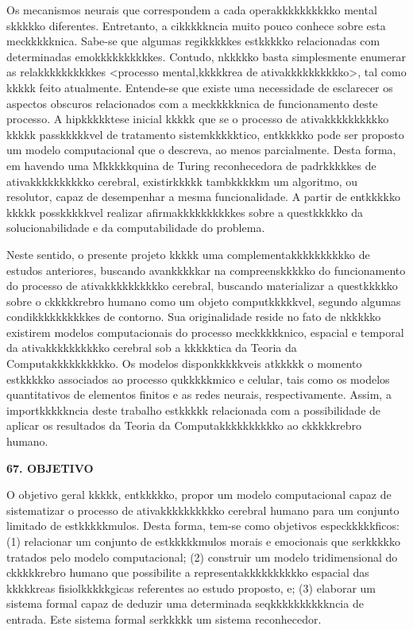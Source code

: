 \documentclass[a4paper,12pt,oneside,openany]{report}
\begin{document}
Os mecanismos neurais que correspondem a cada operakkkkkkkkkko mental skkkkko diferentes. Entretanto, a cikkkkkncia muito pouco conhece sobre esta meckkkkknica. Sabe-se que algumas regikkkkkes estkkkkko relacionadas com determinadas emokkkkkkkkkkes. Contudo, nkkkkko basta simplesmente enumerar as relakkkkkkkkkkes <processo mental,kkkkkrea de ativakkkkkkkkkko>, tal como kkkkk feito atualmente. Entende-se que existe uma necessidade de esclarecer os aspectos obscuros relacionados com a meckkkkknica de funcionamento deste processo. A hipkkkkktese inicial kkkkk que se o processo de ativakkkkkkkkkko kkkkk passkkkkkvel de tratamento sistemkkkkktico, entkkkkko pode ser proposto um modelo computacional que o descreva, ao menos parcialmente. Desta forma, em havendo uma Mkkkkkquina de Turing reconhecedora de padrkkkkkes de ativakkkkkkkkkko cerebral, existirkkkkk tambkkkkkm um algoritmo, ou resolutor, capaz de desempenhar a mesma funcionalidade. A partir de entkkkkko kkkkk posskkkkkvel realizar afirmakkkkkkkkkkes sobre a questkkkkko da solucionabilidade e da computabilidade do problema. 

Neste sentido, o presente projeto kkkkk uma complementakkkkkkkkkko de estudos anteriores, buscando avankkkkkar na compreenskkkkko do funcionamento do processo de ativakkkkkkkkkko cerebral, buscando materializar a questkkkkko sobre o ckkkkkrebro humano como um objeto computkkkkkvel, segundo algumas condikkkkkkkkkkes de contorno. Sua originalidade reside no fato de nkkkkko existirem modelos computacionais do processo meckkkkknico, espacial e temporal da ativakkkkkkkkkko cerebral sob a kkkkktica da Teoria da Computakkkkkkkkkko. Os modelos disponkkkkkveis atkkkkk o momento estkkkkko associados ao processo qukkkkkmico e celular, tais como os modelos quantitativos de elementos finitos e as redes neurais, respectivamente. Assim, a importkkkkkncia deste trabalho estkkkkk relacionada com a possibilidade de aplicar os resultados da Teoria da Computakkkkkkkkkko ao ckkkkkrebro humano.


\vspace{0.4cm}
\textbf{67. OBJETIVO}

O objetivo geral kkkkk, entkkkkko, propor um modelo computacional capaz de sistematizar o processo de ativakkkkkkkkkko cerebral humano para um conjunto limitado de estkkkkkmulos. Desta forma, tem-se como objetivos especkkkkkficos: (1) relacionar um conjunto de estkkkkkmulos morais e emocionais que serkkkkko tratados pelo modelo computacional; (2) construir um modelo tridimensional do ckkkkkrebro humano que possibilite a representakkkkkkkkkko espacial das kkkkkreas fisiolkkkkkgicas referentes ao estudo proposto, e; (3) elaborar um sistema formal capaz de deduzir uma determinada seqkkkkkkkkkkncia de entrada. Este sistema formal serkkkkk um sistema reconhecedor.
\end{document}
